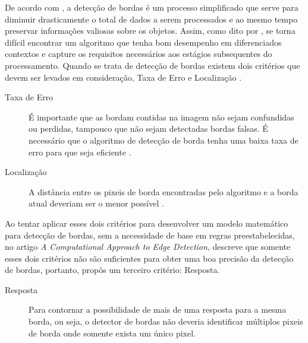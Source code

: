 De acordo com , a detecção de bordas é um processo simplificado que serve para diminuir drasticamente o total de dados a serem processados e ao mesmo tempo preservar informações valiosas sobre os objetos. %
Assim, como dito por , se torna difícil encontrar um algoritmo que tenha bom desempenho em diferenciados contextos e capture os requisitos necessários aos estágios subsequentes do processamento. 
Quando se trata de detecção de bordas existem dois critérios que devem ser levados em consideração, Taxa de Erro e Localização \cite{Canny:1986, Vale:2002}. 

\begin{description}
	\item[Taxa de Erro] É importante que as bordam contidas na imagem não sejam confundidas ou perdidas, tampouco que não sejam detectadas bordas falsas. É necessário que o algoritmo de detecção de borda tenha uma baixa taxa de erro para que seja eficiente \cite{Wangenheim:2014, Canny:1986, Vale:2002}.
	\item[Localização] A distância entre os pixeis de borda encontradas pelo algoritmo e a borda atual deveriam ser o menor possível \cite{Wangenheim:2014}.
\end{description}
Ao tentar aplicar esses dois critérios para desenvolver um modelo matemático para detecção de bordas, sem a necessidade de base em regras preestabelecidas, no artigo 
\textit{A Computational Approach to Edge Detection},  descreve que somente esses dois critérios não são suficientes para obter uma boa precisão da detecção de bordas, portanto, propôs um terceiro critério: Resposta.
\begin{description}
	\item[Resposta] Para contornar a possibilidade de mais de uma resposta para a mesma borda, ou seja, o detector de bordas não deveria identificar múltiplos pixeis de borda onde somente exista um único pixel.
\end{description}

